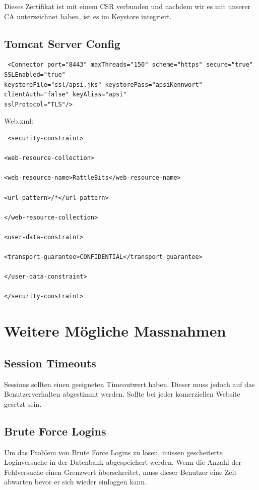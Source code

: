 \documentclass[10pt]{scrartcl}
\begin{document}
Dieses Zertifikat ist mit einem CSR verbunden und nachdem wir es mit unserer CA unterzeichnet haben, ist es im Keystore integriert.

\subsection{Tomcat Server Config}
\begin{verbatim}
 <Connector port="8443" maxThreads="150" scheme="https" secure="true" SSLEnabled="true" 
keystoreFile="ssl/apsi.jks" keystorePass="apsiKennwort" clientAuth="false" keyAlias="apsi" 
sslProtocol="TLS"/>
\end{verbatim}

Web.xml: \\
\begin{verbatim}
 <security-constraint>

<web-resource-collection>

<web-resource-name>RattleBits</web-resource-name>

<url-pattern>/*</url-pattern>

</web-resource-collection>

<user-data-constraint>

<transport-guarantee>CONFIDENTIAL</transport-guarantee>

</user-data-constraint>

</security-constraint>
\end{verbatim}


\section{Weitere Mögliche Massnahmen}

\subsection{Session Timeouts}
Sessions sollten einen geeigneten Timeoutwert haben. Dieser muss jedoch auf das Benutzerverhalten abgestimmt werden. Sollte bei jeder komerziellen Website gesetzt sein.

\subsection{Brute Force Logins}
Um das Problem von Brute Force Logins zu lösen, müssen gescheiterte Loginversuche in der Datenbank abgespeichert werden. Wenn die Anzahl der Fehlversuche einen Grenzwert überschreitet, muss dieser Benutzer eine Zeit abwarten bevor er sich wieder einloggen kann. 
 
\end{document}
